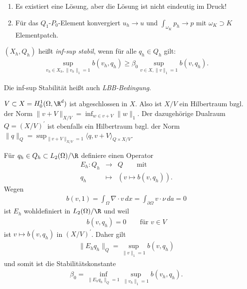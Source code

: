 \begin{Bemerkung}
    \begin{enumerate}[1)]
      \item
        Es existiert eine Lösung, aber die Lösung ist nicht eindeutig im
        Druck!
      \item
        Für das $Q_1$-$P_0$-Element konvergiert $u_h \to u$ und
        $\int_{\omega_K} p_h \to p$ mit $\omega_K \supset K$ Elementpatch.
    \end{enumerate}
\end{Bemerkung}


\begin{Definition}
    \label{def:5.7}
    $(X_h,Q_h)$ heißt \emph{inf-sup stabil}, wenn für alle $q_h\in Q_h$ gilt: 
    \begin{eqnarray*}
            \sup_{v_h\in X_h, \|v_h\|_1 = 1} b(v_h,q_h) 
        \ge \beta_0 \sup_{v\in X, \|v\|_1 = 1} b(v,q_h).
    \end{eqnarray*}
\end{Definition}


\begin{Bemerkung}
    Die inf-sup Stabilität hei\ss{}t auch \emph{LBB-Bedingung}.
\end{Bemerkung}


\begin{Bemerkung}
    $V \subset X = H_0^1(\Omega, \R^d)$ ist abgeschlossen in $X$.
    Also ist $X / V$ ein Hilbertraum bzgl. der Norm
    $\|v + V\|_{X / V} = \inf_{w\in v + V} \|w\|_1$.
    Der dazugehörige Dualraum $Q = (X / V)^\prime$ ist ebenfalls ein
    Hilbertraum bzgl. der Norm
    $\|q\|_Q = \sup_{\|v + V\|_{X / V} = 1} \langle q, v + V \rangle
    _{Q \times X / V}$.

    Für $q_h\in Q_h \subset L_2(\Omega) / \R$ definiere einen Operator
    \begin{eqnarray*}
        E_h: Q_h &\to& Q \qquad \text{mit} \\
        q_h &\mapsto& (v \mapsto b(v, q_h)).
    \end{eqnarray*}
    Wegen
    \begin{eqnarray*}
          b(v, 1)
        = \int_\Omega \nabla \cdot v \,dx
        = \int_{\partial\Omega} v \cdot \nu \,da
        = 0
    \end{eqnarray*}
    ist $E_h$ wohldefiniert in $L_2(\Omega) / \R$ und weil
    \begin{eqnarray*}
        b(v, q_h) = 0 \qquad \text{für } v\in V
    \end{eqnarray*}
    ist $v \mapsto b(v, q_h)$ in $(X / V)^\prime$. Daher gilt
    \begin{eqnarray*}
          \|E_h q_h\|_Q
        = \sup_{\|v\|_1 = 1} b(v, q_h)
    \end{eqnarray*}
    und somit ist die Stabilitätskonstante
    \begin{eqnarray*}
        \beta_0 = \inf_{\|E_h q_h\|_Q = 1} \sup_{\|v_h\|_1 = 1} b(v_h, q_h).
    \end{eqnarray*}
\end{Bemerkung}


